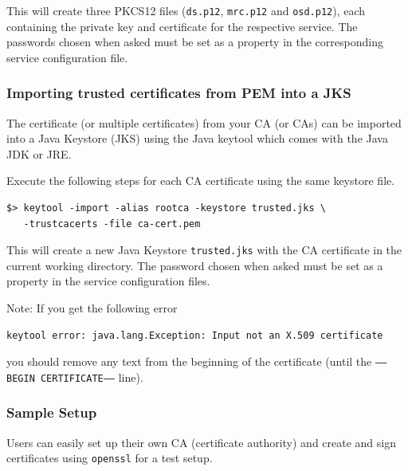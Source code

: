 \documentclass[a4paper,10pt]{book}
\begin{document}
This will create three PKCS12 files (\texttt{ds.p12}, \texttt{mrc.p12} and \texttt{osd.p12}), each containing the private key and certificate for the respective service. The passwords chosen when asked must be set as a property in the corresponding service configuration file.


\subsubsection{Importing trusted certificates from PEM into a JKS}

The certificate (or multiple certificates) from your CA (or CAs) can be imported into a Java Keystore (JKS)  using the Java keytool which comes with the Java JDK or JRE.

Execute the following steps for each CA certificate using the same keystore file.


\begin{verbatim}
$> keytool -import -alias rootca -keystore trusted.jks \
   -trustcacerts -file ca-cert.pem
\end{verbatim}


This will create a new Java Keystore \texttt{trusted.jks} with the CA certificate in the current working directory. The password chosen when asked must be set as a property in the service configuration files.

Note: If you get the following error
\begin{verbatim}
keytool error: java.lang.Exception: Input not an X.509 certificate
\end{verbatim}
you should remove any text from the beginning of the certificate (until the \texttt{-----BEGIN CERTIFICATE-----} line).


\subsubsection{Sample Setup}

Users can easily set up their own CA (certificate authority) and create and sign certificates using \texttt{openssl} for a test setup.
\end{document}
